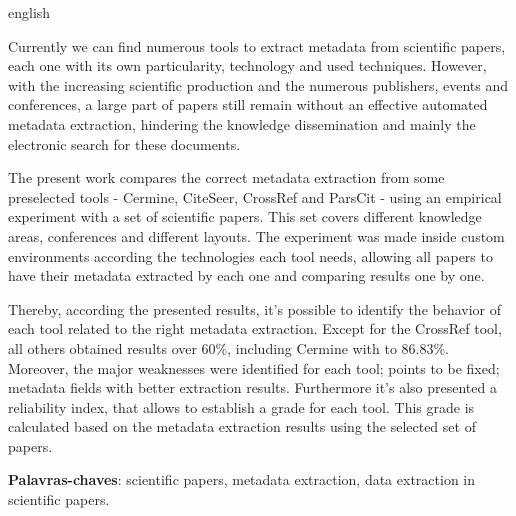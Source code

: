 \begin{resumo}[Abstract]
\begin{otherlanguage*}{english}

Currently we can find numerous tools to extract metadata from scientific papers, each one with its own particularity, technology and used techniques. However, with the increasing scientific production and the numerous publishers, events and conferences, a large part of papers still remain without an effective automated metadata extraction, hindering the knowledge dissemination and mainly the electronic search for these documents. 

The present work compares the correct metadata extraction from some preselected tools - Cermine, CiteSeer, CrossRef and ParsCit - using an empirical experiment with a set of scientific papers. This set covers different knowledge areas, conferences and different layouts. The experiment was made inside custom environments according the technologies each tool needs, allowing all papers to have their metadata extracted by each one and comparing results one by one. 

Thereby, according the presented results, it's possible to identify the behavior of each tool related to the right metadata extraction. Except for the CrossRef tool, all others obtained results over 60\%, including Cermine with to 86.83\%. Moreover, the major weaknesses were identified for each tool; points to be fixed; metadata fields with better extraction results. Furthermore it's also presented a reliability index, that allows to establish a grade for each tool. This grade is calculated based on the metadata extraction results using the selected set of papers.

\textbf{Palavras-chaves}: scientific papers, metadata extraction, data extraction in scientific papers.


\end{otherlanguage*}
\end{resumo}

 

  
